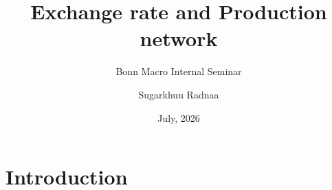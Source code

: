 \documentclass[aspectratio=43, 10pt]{beamer}
\title{\textbf{Exchange rate and Production network}}
\subtitle{Bonn Macro Internal Seminar} %
\author{Sugarkhuu Radnaa}
\institute[]{Bonn Graduate School of Economics}
\date{July, 2026}
\begin{document}
\begin{frame}[plain]
  \titlepage
\end{frame}

\section{Introduction}
\end{document}
